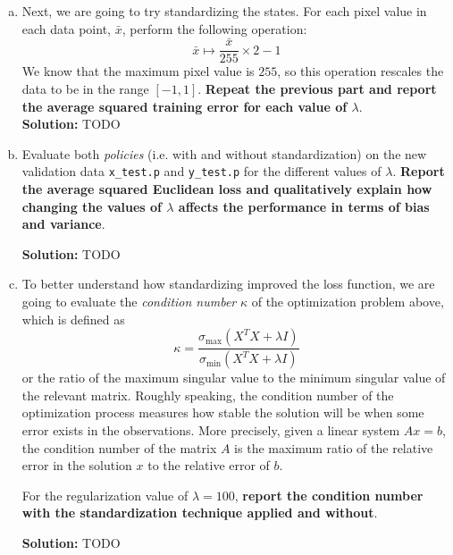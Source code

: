 \documentclass{article}
\newenvironment{solution}{\color{blue} \smallskip \textbf{Solution:}}{}
\begin{document}
\begin{enumerate}[(a)]
    \newpage
    \item Next, we are going to try standardizing the states. For each pixel value in each data point, $\bar{x}$, perform the following operation: 
    \[\bar{x} \mapsto \frac{\bar{x}}{255} \times 2 - 1\]
    We know that the maximum pixel value is $255$, so this operation rescales the data to be in the range $[-1, 1]$.
    \textbf{Repeat the previous part and report the average squared training error for each value of $\lambda$}. \\
    
    \begin{solution}
        TODO
    \end{solution}

    \newpage
    \item Evaluate both \emph{policies} (i.e. with and without standardization) on the new validation data \texttt{x\_test.p} and \texttt{y\_test.p} for the different values of $\lambda$. \textbf{Report the average squared Euclidean loss and qualitatively explain how changing the values of $\lambda$ affects the performance in terms of bias and variance}. 
    
    \begin{solution}
        TODO
    \end{solution}

    \newpage
    \item To better understand how standardizing improved the loss function, we are going to evaluate the \emph{condition number} $\kappa$ of the optimization problem above, which is defined as
    \[\kappa = \frac{\sigma_{\mbox{max}}(X^TX+\lambda I)}{\sigma_{\mbox{min}}(X^TX+\lambda I)}\]
    or the ratio of the maximum singular value to the minimum singular value of the relevant matrix. Roughly speaking, the condition number of the optimization process measures how stable the solution will be when some error exists in the observations. More precisely, given a linear system $Ax=b$, the condition number of the matrix $A$ is the maximum ratio of the relative error in the solution $x$ to the relative error of $b$.
    
    For the regularization value of $\lambda = 100$, {\bf report the condition number with the standardization technique applied and without}. 
    
    \begin{solution}
        TODO
    \end{solution}

\end{enumerate}
\end{document}
